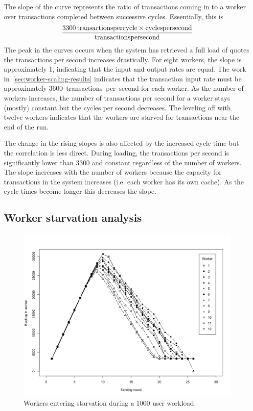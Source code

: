 The slope of the curve represents the ratio of transactions coming in to a worker over transactions completed between successive cycles.
Essentially, this is
\begin{equation*}
  {\SI{3300}{transactions per cycle} \times \si{cycles per second} \over \si{transactions per second}}
\end{equation*}
The peak in the curves occurs when the system has retrieved a full load of quotes the transactions per second increases drastically.
For eight workers, the slope is approximately 1, indicating that the input and output rates are equal.
The work in~\ref{sec:worker-scaling-results} indicates that the transaction input rate must be approximately \SI{3600}{transactions per second} for each worker.
As the number of workers increases, the number of transactions per second for a worker stays (mostly) constant but the cycles per second decreases.
The leveling off with twelve workers indicates that the workers are starved for transactions near the end of the run.

The change in the rising slopes is also affected by the increased cycle time but the correlation is less direct.
During loading, the transactions per second is significantly lower than 3300 and constant regardless of the number of workers.
The slope increases with the number of workers because the capacity for transactions in the system increases (i.e. each worker has its own cache).
As the cycle times become longer this decreases the slope.

\subsection{Worker starvation analysis}

\begin{figure}[tbph]
  \centering
  \includegraphics[width=0.85\linewidth]{../../data/worker-load/backlog_12w}
  \caption{Workers entering starvation during a 1000 user workload}
  \label{fig:backlog12w}
\end{figure}

